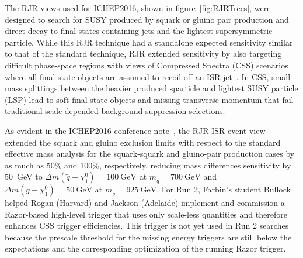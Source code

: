 The RJR views used for ICHEP2016, shown in figure~\ref{fig:RJRTrees},
were designed to search for SUSY produced by squark or gluino pair
production and direct decay to final states containing jets and the
lightest supersymmetric particle. While this RJR technique had a
standalone expected sensitivity similar to that of the standard
technique, RJR extended sensitivity by also targeting difficult
phase-space regions with views of Compressed Spectra (CSS) scenarios
where all final state objects are assumed to recoil off an ISR
jet~\cite{Jackson:2016mfb}. In CSS, small mass splittings between the
heavier produced sparticle and lightest SUSY particle (LSP) lead to
soft final state objects and missing transverse momentum that fail
traditional scale-depended background suppression selections.

As evident in the ICHEP2016 conference
note~\cite{ATLAS-CONF-2016-078}, the RJR ISR event view extended the
squark and gluino exclusion limits with respect to the standard
effective mass analysis for the squark-squark and gluino-pair
production cases by as much as 50\% and 100\%, respectively, reducing
mass differences sensitivity by 50~GeV to $\Delta m(\tilde{q} -
\chi_1^0) = 100~\mathrm{GeV}$ at $m_{\tilde{q}} = 700~\mathrm{GeV}$  and 
$\Delta m(\tilde{g} -\chi_1^0) = 50~\mathrm{GeV}$ at $m_{\tilde{g}} =
925~\mathrm{GeV}$. For Run 2, Farbin's student Bullock helped Rogan
(Harvard) and Jackson (Adelaide) implement and commission a
Razor-based high-level trigger that uses only scale-less quantities
and therefore enhances CSS trigger efficiencies. This trigger is not
yet used in Run 2 searches because the prescale threshold for the
missing energy triggers are still below the expectations and the
corresponding optimization of the running Razor trigger.

